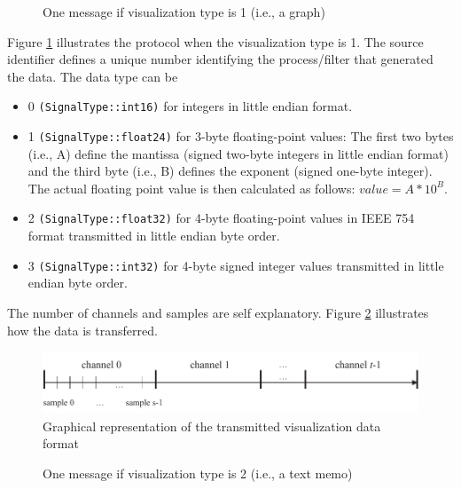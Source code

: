 \documentclass[letterpaper,oneside,12pt]{book}
\begin{document}
\begin{figure}[ht]
 \centerline{}
 \caption{One message if visualization type is 1 (i.e., a graph)}
 \label{visualizationprotocol_type1}
\end{figure}

Figure \ref{visualizationprotocol_type1} illustrates the protocol when the 
visualization type is 1. The source identifier defines a unique number 
identifying the process/filter that generated the data. The data type can be 
\begin{itemize}
\item 0 \texttt{(SignalType::int16)} for integers in little endian format.
\item 1 \texttt{(SignalType::float24)} for 3-byte floating-point values:
The first two bytes (i.e., A) define 
the mantissa (signed two-byte integers in little endian format) and the third 
byte (i.e., B) defines the exponent (signed one-byte integer). The actual floating 
point value is then calculated as follows: $value=A*10^{B}$.
\item 2 \texttt{(SignalType::float32)} for 4-byte floating-point values in IEEE 754 format transmitted in little endian byte order.
\item 3 \texttt{(SignalType::int32)} for 4-byte signed integer values transmitted in little endian byte order.
\end{itemize}

The number of channels and samples are self explanatory.
Figure \ref{visualization_type1} illustrates how the data is transferred.

\begin{figure}[ht]
 \centerline{\includegraphics{figures/visualization_type1}}
 \caption{Graphical representation of the transmitted visualization data format}
 \label{visualization_type1}
\end{figure}

\begin{figure}[ht]
 \centerline{}
 \caption{One message if visualization type is 2 (i.e., a text memo)}
 \label{visualizationprotocol_type2}
\end{figure}
\end{document}
